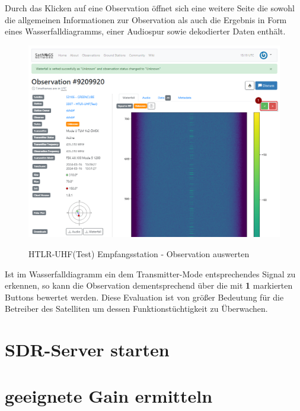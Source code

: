 Durch das Klicken auf eine Observation öffnet sich eine weitere Seite die sowohl die allgemeinen Informationen zur Observation als auch die Ergebnis in Form eines Wasserfalldiagramms, einer Audiospur sowie dekodierter Daten enthält. 

\begin{figure} [H]
	\centering
	\includegraphics[width=\linewidth]{../ref/vet_observation.png}
	\caption{HTLR-UHF(Test) Empfangsstation - Observation auswerten} \cite{noauthor_satnogs_nodate}
	\label{fig:htrl-uhf(test)vetobservation}
\end{figure}

Ist im Wasserfalldiagramm ein dem Transmitter-Mode entsprechendes Signal zu erkennen, so kann die Observation dementsprechend über die mit \textbf{1} markierten Buttons bewertet werden. Diese Evaluation ist von größer Bedeutung für die Betreiber des Satelliten um dessen Funktionstüchtigkeit zu Überwachen.

\section{SDR-Server starten}

\section{geeignete Gain ermitteln}
